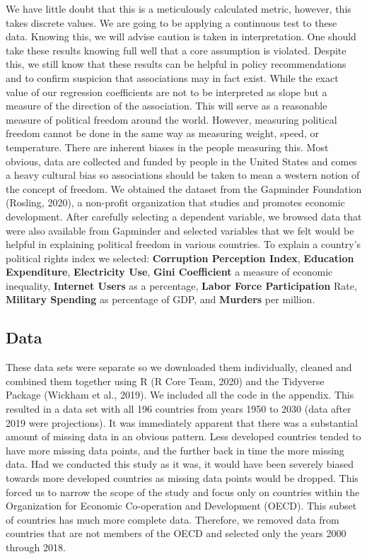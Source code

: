 \documentclass[
  english,
  man,floatsintext]{apa6}
\begin{document}
We have little doubt that this is a meticulously calculated metric, however, this takes discrete values. We are going to be applying a continuous test to these data. Knowing this, we will advise caution is taken in interpretation. One should take these results knowing full well that a core assumption is violated. Despite this, we still know that these results can be helpful in policy recommendations and to confirm suspicion that associations may in fact exist. While the exact value of our regression coefficients are not to be interpreted as slope but a measure of the direction of the association. This will serve as a reasonable measure of political freedom around the world. However, measuring political freedom cannot be done in the same way as measuring weight, speed, or temperature. There are inherent biases in the people measuring this. Most obvious, data are collected and funded by people in the United States and comes a heavy cultural bias so associations should be taken to mean a western notion of the concept of freedom.
We obtained the dataset from the Gapminder Foundation (Rosling, 2020), a non-profit organization that studies and promotes economic development. After carefully selecting a dependent variable, we browsed data that were also available from Gapminder and selected variables that we felt would be helpful in explaining political freedom in various countries. To explain a country's political rights index we selected: \textbf{Corruption Perception Index}, \textbf{Education Expenditure}, \textbf{Electricity Use}, \textbf{Gini Coefficient} a measure of economic inequality, \textbf{Internet Users} as a percentage, \textbf{Labor Force Participation} Rate, \textbf{Military Spending} as percentage of GDP, and \textbf{Murders} per million.

\hypertarget{data}{%
\subsection{Data}\label{data}}

These data sets were separate so we downloaded them individually, cleaned and combined them together using R (R Core Team, 2020) and the Tidyverse Package (Wickham et al., 2019). We included all the code in the appendix. This resulted in a data set with all 196 countries from years 1950 to 2030 (data after 2019 were projections). It was immediately apparent that there was a substantial amount of missing data in an obvious pattern. Less developed countries tended to have more missing data points, and the further back in time the more missing data. Had we conducted this study as it was, it would have been severely biased towards more developed countries as missing data points would be dropped. This forced us to narrow the scope of the study and focus only on countries within the Organization for Economic Co-operation and Development (OECD). This subset of countries has much more complete data. Therefore, we removed data from countries that are not members of the OECD and selected only the years 2000 through 2018.
\end{document}
